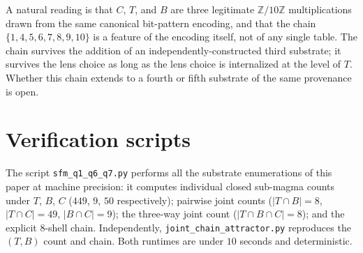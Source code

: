 \documentclass[11pt,reqno]{amsart}
\theoremstyle{definition}
\newcommand{\Z}{\mathbb{Z}}
\begin{document}
A natural reading is that $C$, $T$, and $B$ are three legitimate
$\Z/10\Z$ multiplications drawn from the same canonical
bit-pattern encoding, and that the chain $\{1,4,5,6,7,8,9,10\}$
is a feature of the encoding itself, not of any single table.
The chain survives the addition of an independently-constructed
third substrate; it survives the lens choice as long as the
lens choice is internalized at the level of $T$. Whether this
chain extends to a fourth or fifth substrate of the same
provenance is open.

\section*{Verification scripts}

The script \texttt{sfm\_q1\_q6\_q7.py} \cite{SFM2026} performs
all the substrate enumerations of this paper at machine
precision: it computes individual closed sub-magma counts under
$T$, $B$, $C$ ($449$, $9$, $50$ respectively); pairwise joint
counts ($|T\cap B|=8$, $|T\cap C|=49$, $|B\cap C|=9$); the
three-way joint count ($|T\cap B\cap C|=8$); and the explicit
$8$-shell chain. Independently, \texttt{joint\_chain\_attractor.py}
\cite{Gen13WP115} reproduces the $(T,B)$ count and chain. Both
runtimes are under $10$ seconds and deterministic.
\end{document}
